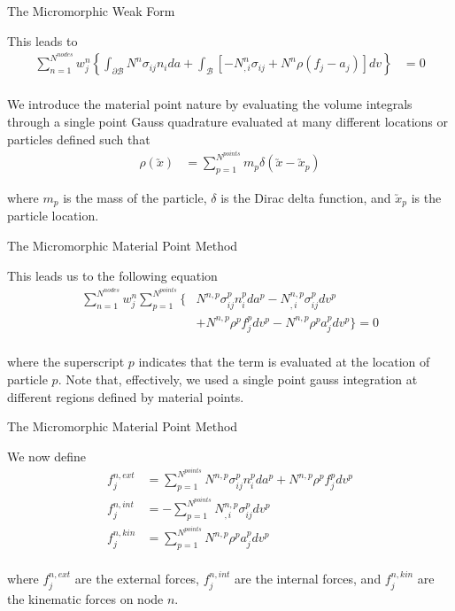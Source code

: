 \documentclass[11pt]{beamer}
\newcommand{\VEC}[1]{\utilde{#1}}
\begin{document}
\begin{frame}{The Micromorphic Weak Form}

This leads to
\begin{align*}
\sum_{n=1}^{N^{nodes}} w_j^n\left\{ \int_{\partial \mathcal{B}} N^n \sigma_{ij} n_i da + \int_{\mathcal{B}} \left[ - N_{,i}^{n} \sigma_{ij} + N^n \rho \left(f_j - a_j \right) \right] dv\right\} &= 0\\
\end{align*}

We introduce the material point nature by evaluating the volume integrals through a single point Gauss quadrature evaluated at many different locations or particles defined such that
\begin{align*}
\rho\left(\VEC{x}\right) &= \sum_{p=1}^{N^{points}} m_p \delta\left(\VEC{x}-\VEC{x}_p\right)
\end{align*}

where $m_p$ is the mass of the particle, $\delta$ is the Dirac delta function, and $\VEC{x}_p$ is the particle location.

\end{frame}

\begin{frame}{The Micromorphic Material Point Method}

This leads us to the following equation
\begin{align*}
\sum_{n=1}^{N^{nodes}} w_j^n \sum_{p=1}^{N^{points}}\bigg\{& N^{n,p} \sigma_{ij}^p n_i^p da^p - N_{,i}^{n,p} \sigma_{ij}^p dv^p\\
& + N^{n,p} \rho^p f_j^p dv^p- N^{n,p} \rho^p a_j^p dv^p \bigg\}= 0\\
\end{align*}

where the superscript $p$ indicates that the term is evaluated at the location of particle $p$. Note that, effectively, we used a single point gauss integration at different regions defined by material points.

\end{frame}

\begin{frame}{The Micromorphic Material Point Method}

We now define
\begin{align*}
f_j^{n,ext} &= \sum_{p=1}^{N^{points}}N^{n,p} \sigma_{ij}^p n_i^p da^p + N^{n,p} \rho^p f_j^p dv^p\\
f_j^{n,int} &= - \sum_{p=1}^{N^{points}}N_{,i}^{n,p} \sigma_{ij}^p dv^p\\
f_j^{n,kin} &= \sum_{p=1}^{N^{points}}N^{n,p} \rho^p a_j^p dv^p\\
\end{align*}

where $f_j^{n,ext}$ are the external forces, $f_j^{n,int}$ are the internal forces, and $f_j^{n,kin}$ are the kinematic forces on node $n$. \end{frame}
\end{document}
